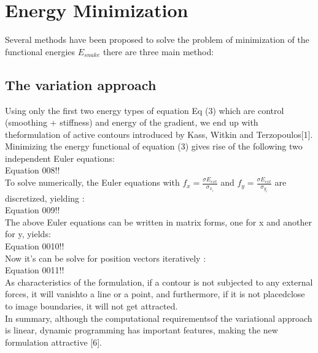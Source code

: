 \section{Energy Minimization}\label{sec:energy-minimization}

Several methods have been proposed to solve the problem of minimization of
the functional energies $E_{snake}$ there are three main method:

\subsection{The variation approach}\label{subsec:the-variation-approach}
\hspace{1cm}Using only the first two energy types of equation Eq (3) which are
control (smoothing + stiffness) and energy of the gradient, we end up with
theformulation of active contours introduced by Kass, Witkin and
Terzopoulos[1].\\
Minimizing the energy functional of equation (3) gives rise of the following two
independent Euler equations:\\
Equation 008!!\\
To solve numerically, the Euler equations with $f_x =\frac{\sigma E_{ext}}{\sigma_{x_i}}$ and $f_y =\frac{\sigma E_{ext}}{\sigma_{y_i}}$
are discretized, yielding :\\
Equation 009!!\\
The above Euler equations can be written in matrix forms, one for x and
another for y, yields:\\
Equation 0010!!\\
Now it’s can be solve for position vectors iteratively :\\
Equation 0011!!\\
As characteristics of the formulation, if a contour is not subjected to any
external forces, it will vanishto a line or a point, and furthermore, if it is not
placedclose to image boundaries, it will not get attracted.\\
\hspace{1cm}In summary, although the computational requirementsof the variational
approach is linear, dynamic programming has important features, making the
new formulation attractive [6].
